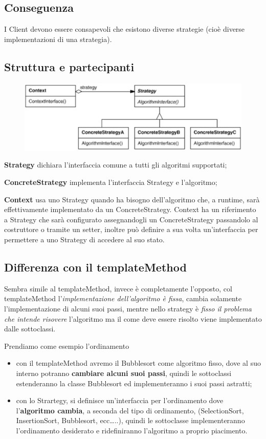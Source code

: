 \subsection{Conseguenza}

I Client devono essere consapevoli che esistono diverse strategie (cioè diverse implementazioni di una strategia).

\subsection{Struttura e partecipanti}

\begin{figure}[H]
    \centering   
    \includegraphics[width=0.5\linewidth]{../../immagini/templateMethod_Strategy/struttura_strategy}    
\end{figure}

\textbf{Strategy} dichiara l’interfaccia comune a tutti gli algoritmi supportati;

\textbf{ConcreteStrategy} implementa l’interfaccia Strategy e l’algoritmo;

\textbf{Context} usa uno Strategy quando ha bisogno dell’algoritmo che, a runtime, sarà effettivamente implementato da un ConcreteStrategy.
Context ha un riferimento a Strategy che sarà configurato assegnandogli un ConcreteStrategy passandolo al costruttore o tramite un setter, inoltre può definire a sua 
volta un’interfaccia per permettere a uno Strategy di accedere al suo stato.

\subsection{Differenza con il templateMethod}

Sembra simile al templateMethod, invece è completamente l'opposto, col templateMethod l'\textit{implementazione dell'algoritmo è fissa}, cambia solamente 
l'implementazione di alcuni suoi passi, mentre nello strategy è \textit{fisso il problema che intende risovere} l'algoritmo ma il come deve essere risolto viene 
implementato dalle sottoclassi. 

Prendiamo come esempio l'ordinamento

\begin{itemize}
    \item con il templateMethod avremo il Bubblesort come algoritmo fisso, dove al suo interno potranno \textbf{cambiare alcuni suoi passi}, quindi le sottoclassi
    estenderanno la classe Bubblesort ed implementeranno i suoi passi astratti;
    \item con lo Strartegy, si definisce un'interfaccia per l'ordinamento dove l'\textbf{algoritmo cambia}, a seconda del tipo di ordinamento,  
    (SelectionSort, InsertionSort, Bubblesort, ecc\dots..), quindi le sottoclasse implementeranno l'ordinamento desiderato e ridefiniranno l'algoritmo a proprio 
    piacimento.
\end{itemize}

